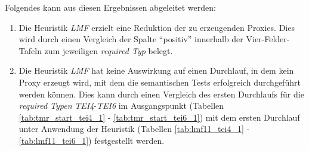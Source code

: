 \begin{multicols}{3}
\columnbreak
{}\columnbreak
{}
\end{multicols}
\noindent
Folgendes kann aus diesen Ergebnissen abgeleitet werden:
\begin{enumerate}
\item Die Heuristik \emph{LMF} erzielt eine Reduktion der zu erzeugenden Proxies. Dies wird durch einen Vergleich der Spalte ``positiv'' innerhalb der Vier-Felder-Tafeln zum jeweiligen \emph{required Typ} belegt.

\item Die Heuristik \emph{LMF} hat keine Auswirkung auf einen Durchlauf, in dem kein Proxy erzeugt wird, mit dem die semantischen Tests erfolgreich durchgeführt werden können. Dies kann durch einen Vergleich des ersten Durchlaufs für die \emph{required Typen} \emph{TEI4}-\emph{TEI6} im Ausgangspunkt (Tabellen \ref{tab:tmr_start_tei4_1} - \ref{tab:tmr_start_tei6_1}) mit dem ersten Durchlauf unter Anwendung der Heuristik (Tabellen \ref{tab:lmf11_tei4_1} - \ref{tab:lmf11_tei6_1}) festgestellt werden.
\end{enumerate}



